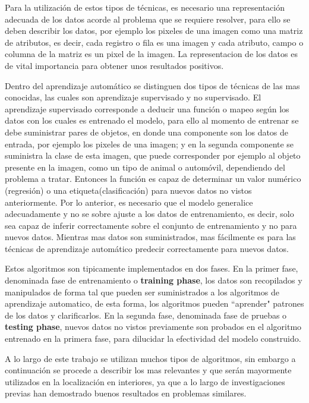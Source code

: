 Para la utilización de estos tipos de técnicas, es necesario una representación adecuada de los datos acorde al problema que se requiere resolver, para ello se deben describir los datos, por ejemplo los pixeles de una imagen como una matriz de atributos, es decir, cada registro o fila es una imagen y cada atributo, campo o columna de la matriz es un pixel de la imagen. La representacion de los datos es de vital importancia para obtener unos resultados positivos.

Dentro del aprendizaje automático se distinguen dos tipos de técnicas de las mas conocidas, las cuales son aprendizaje supervisado y no supervisado. El aprendizaje supervisado corresponde a deducir una función o mapeo según los datos con los cuales es entrenado el modelo, para ello al momento de entrenar se debe suministrar pares de objetos, en donde una componente son los datos de entrada, por ejemplo los pixeles de una imagen; y en la segunda componente se suministra la clase de esta imagen, que puede corresponder por ejemplo al objeto presente en la imagen, como un tipo de animal o automóvil, dependiendo del problema a tratar. Entonces la función es capaz de determinar un valor numérico (regresión) o una etiqueta(clasificación) para nuevos datos no vistos anteriormente. Por lo anterior, es necesario que el modelo generalice adecuadamente y no se sobre ajuste a los datos de entrenamiento, es decir, solo sea capaz de inferir correctamente sobre el conjunto de entrenamiento y no para nuevos datos. Mientras mas datos son suministrados, mas fácilmente es para las técnicas de aprendizaje automático predecir correctamente para nuevos datos.

Estos algoritmos son tipicamente implementados en dos fases. En la primer fase, denominada fase de entrenamiento o \textbf{training phase}, los datos son recopilados y manipulados de forma tal que pueden ser suministrados a los algoritmos de aprendizaje automatico, de esta forma, los algoritmos pueden ``aprender" patrones de los datos y clarificarlos. En la segunda fase, denominada fase de pruebas o \textbf{testing phase}, nuevos datos no vistos previamente son probados en el algoritmo entrenado en la primera fase, para dilucidar la efectividad del modelo construido.

A lo largo de este trabajo se utilizan muchos tipos de algoritmos, sin embargo a continuación se procede a describir los mas relevantes y que serán mayormente utilizados en la localización en interiores, ya que a lo largo de investigaciones previas han demostrado buenos resultados en problemas similares.

